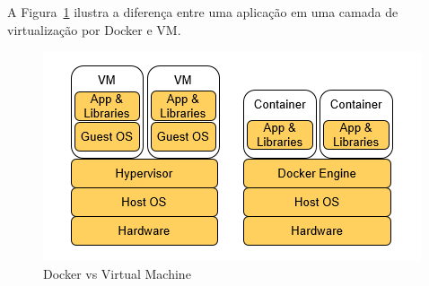 \documentclass[twoside,english,brazilian]{UNISINOSartigo}
\begin{document}
A Figura~\ref{fig:vmvsdocker} ilustra a diferença entre uma aplicação em uma camada de virtualização por Docker e VM.

\begin{figure}
	\caption{Docker vs Virtual Machine}
	\label{fig:vmvsdocker}
	\centering%
	\begin{minipage}{.4\textwidth}
		\includegraphics[width=\textwidth]{vmvsdocker}
	\end{minipage}
\end{figure}
\end{document}
